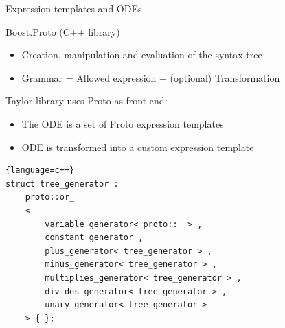 \documentclass{beamer}
\begin{document}
\begin{frame}[fragile]{Expression templates and ODEs}
 
Boost.Proto (C++ library)
\begin{itemize}
  \item Creation, manipulation and evaluation of the syntax tree
  \item Grammar = Allowed expression + (optional) Transformation
\end{itemize}

\vspace{2ex}

\pause

Taylor library uses Proto as front end:
\begin{itemize}
  \item The ODE is a set of Proto expression templates
  \item ODE is transformed into a custom expression template
\end{itemize}

\vspace{2ex}

\begin{lstlisting}{language=c++}
struct tree_generator :
    proto::or_
    <
        variable_generator< proto::_ > ,
        constant_generator ,
        plus_generator< tree_generator > ,
        minus_generator< tree_generator > ,
        multiplies_generator< tree_generator > ,
        divides_generator< tree_generator > ,
        unary_generator< tree_generator >
    > { };
\end{lstlisting}

\end{frame}
\end{document}
